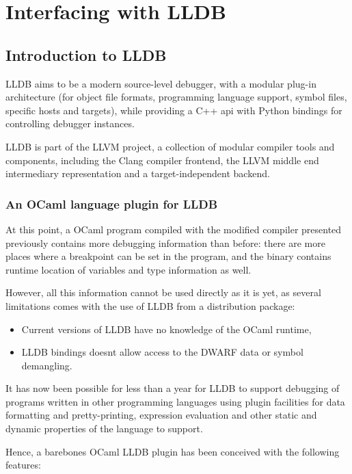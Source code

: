 \chapter{Interfacing with LLDB\label{cha:chapter4}}

\section{Introduction to LLDB}

LLDB\autocite{lldb} aims to be a modern source-level debugger,
with a modular plug-in architecture (for object file
formats, programming language support, symbol files, specific hosts and
targets), while providing a C++ \gls{api} with Python bindings for controlling debugger
instances.

LLDB is part of the LLVM project, a collection of modular compiler tools and
components, including the Clang compiler frontend, the LLVM middle end intermediary
representation and a target-independent backend.

\subsection{An OCaml language plugin for LLDB}

At this point, a OCaml program compiled with the modified compiler
presented previously contains more debugging information than before:
there are more places where a breakpoint can be set in the program, and
the binary contains runtime location of variables and type information as well.

However, all this information cannot be used directly as it is yet,
as several limitations comes with the use of LLDB from a distribution package:

\begin{itemize}
    \item Current versions of LLDB have no knowledge of the OCaml \gls{runtime},
    \item LLDB bindings doesnt allow access to the DWARF data or symbol
        demangling.
\end{itemize}

It has now been possible for less than a year for LLDB to support debugging of programs
written in other programming languages \autocite{lldbpl} using plugin facilities for
data formatting and pretty-printing, expression evaluation and other static and
dynamic properties of the language to support.

Hence, a barebones OCaml LLDB plugin has been conceived with the following
features:

